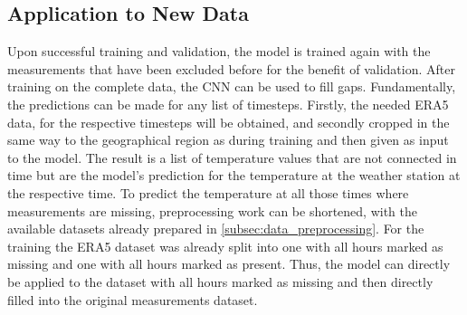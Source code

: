 \subsection{Application to New Data}
Upon successful training and validation, the model is trained again with the measurements that have been excluded before for the benefit of validation.
After training on the complete data, the CNN can be used to fill gaps.
Fundamentally, the predictions can be made for any list of timesteps. Firstly, the needed ERA5 data, for the respective timesteps will be obtained, and secondly cropped in the same way to the geographical region as during training and then given as input to the model.
The result is a list of temperature values that are not connected in time but are the model's prediction for the temperature at the weather station at the respective time.
To predict the temperature at all those times where measurements are missing, preprocessing work can be shortened, with the available datasets already prepared in \ref{subsec:data_preprocessing}.
For the training the ERA5 dataset was already split into one with all hours marked as missing and one with all hours marked as present. Thus, the model can directly be applied to the dataset with all hours marked as missing and then directly filled into the original measurements dataset.